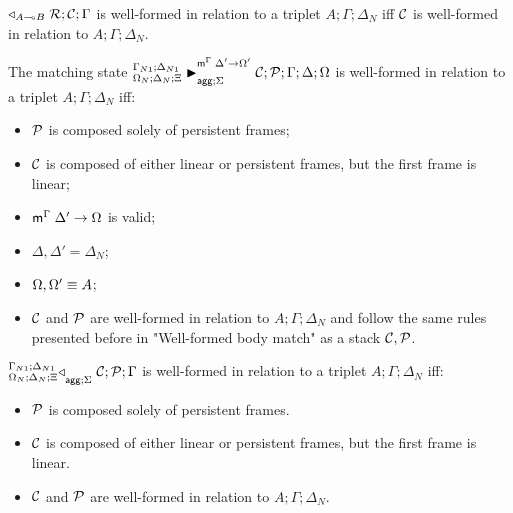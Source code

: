 \begin{definition}
$\contstate{A \lolli B}{\rulestk}{\lstack{C}}{\Gamma}$ is well-formed in
relation to a triplet $A; \Gamma; \Delta_{N}$ iff $\lstack{C}$ is well-formed in
relation to $A; \Gamma; \Delta_{N}$.
\end{definition}

\begin{definition}
The matching state $\matstatea{\Delta_N}{\lstack{C};
      \lstack{P}}{\Gamma}{\Delta}{\Omega}{\Delta' \rightarrow
         \Omega'}{\Sigma}$
is well-formed in relation to a triplet $A; \Gamma; \Delta_{N}$ iff:

\begin{itemize}[leftmargin=*]
   \item $\lstack{P}$ is composed solely of persistent frames;
   \item $\lstack{C}$ is composed of either linear or persistent frames, but the first
   frame is linear;
   \item $\mz{\Gamma}{\Delta'}{\Omega}$ is valid;
   \item $\Delta, \Delta' = \Delta_{N}$;
   \item $\feq{\Omega, \Omega'}{A}$;
   \item $\lstack{C}$ and $\lstack{P}$ are well-formed in relation to $A; \Gamma; \Delta_{N}$ and
   follow the same rules presented before in "Well-formed body match" as a stack
   $\lstack{C}, \lstack{P}$.
\end{itemize}
\end{definition}


\begin{definition}
$\contstatea{\Delta_N}{\lstack{C} ; \lstack{P}}{\Gamma}{\Sigma}$ is well-formed
in relation to a triplet $A; \Gamma; \Delta_{N}$ iff:

\begin{itemize}[leftmargin=*]
   \item $\lstack{P}$ is composed solely of persistent frames.
   \item $\lstack{C}$ is composed of either linear or persistent frames, but the first
   frame is linear.
   \item $\lstack{C}$ and $\lstack{P}$ are well-formed in relation to $A; \Gamma; \Delta_{N}$.
\end{itemize}
\end{definition}

